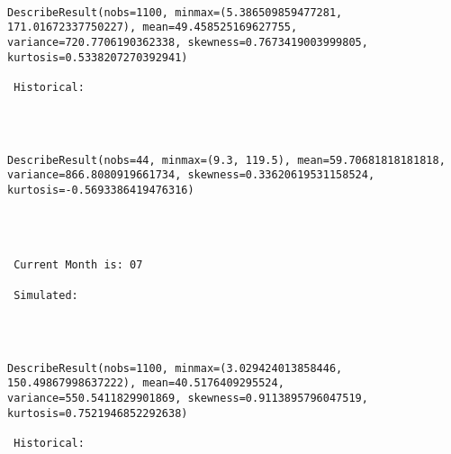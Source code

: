\documentclass[11pt]{article}
\begin{document}
    \begin{center}
    \end{center}
    { \hspace*{\fill} \\}
    
    \begin{Verbatim}[commandchars=\\\{\}]
DescribeResult(nobs=1100, minmax=(5.386509859477281, 171.01672337750227), mean=49.458525169627755, variance=720.7706190362338, skewness=0.7673419003999805, kurtosis=0.5338207270392941)

 Historical: 
 

    \end{Verbatim}

    \begin{center}
    \end{center}
    { \hspace*{\fill} \\}
    
    \begin{Verbatim}[commandchars=\\\{\}]
DescribeResult(nobs=44, minmax=(9.3, 119.5), mean=59.70681818181818, variance=866.8080919661734, skewness=0.33620619531158524, kurtosis=-0.5693386419476316) 



 
 Current Month is: 07

 Simulated: 
 

    \end{Verbatim}

    \begin{center}
    \end{center}
    { \hspace*{\fill} \\}
    
    \begin{Verbatim}[commandchars=\\\{\}]
DescribeResult(nobs=1100, minmax=(3.029424013858446, 150.49867998637222), mean=40.5176409295524, variance=550.5411829901869, skewness=0.9113895796047519, kurtosis=0.7521946852292638)

 Historical: 
 

    \end{Verbatim}
\end{document}
